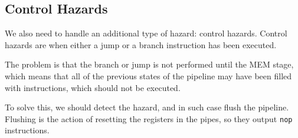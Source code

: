 \documentclass{beamer}
\begin{document}
\subsection{Control Hazards}
\begin{frame}
    We also need to handle an additional type of hazard: control hazards.
    Control hazards are when either a jump or a branch instruction has been
    executed.

    \vspace{\baselineskip}
    The problem is that the branch or jump is not performed until the MEM
    stage, which means that all of the previous states of the pipeline may have
    been filled with instructions, which should not be executed.

    \vspace{\baselineskip}
    To solve this, we should detect the hazard, and in such case flush the
    pipeline. Flushing is the action of resetting the registers in the pipes,
    so they output \texttt{nop} instructions.
\end{frame}
\end{document}

